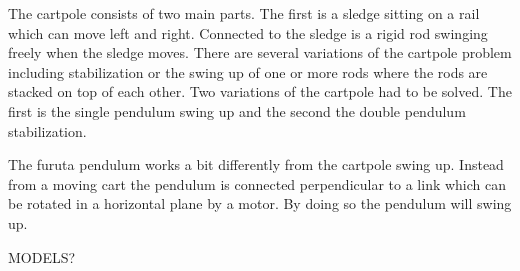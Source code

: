 The cartpole consists of two main parts. The first is a sledge sitting on a rail which can move left and right. Connected to the sledge is a rigid rod swinging freely when the sledge moves. There are several variations of the cartpole problem including stabilization or the swing up of one or more rods where the rods are stacked on top of each other. Two variations of the cartpole had to be solved. The first is the single pendulum swing up and the second the double pendulum stabilization.

The furuta pendulum works a bit differently from the cartpole swing up. Instead from a moving cart the pendulum is connected perpendicular to a link which can be rotated in a horizontal plane by a motor. By doing so the pendulum will swing up.

MODELS?
